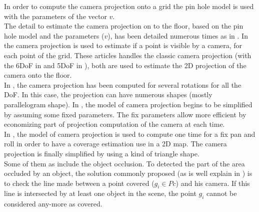  In order to compute the camera projection onto a grid the pin hole model is used with the parameters of the vector $v$.\\
The detail to estimate the camera projection on to the floor, based on the pin hole model and the parameters ($v$), has been detailed numerous times as in \cite{193*fu2014,181*wang2017,165*jiang2010}. In \cite{193*fu2014,181*wang2017,165*jiang2010} the camera projection is used to estimate if a point is visible by a camera, for each point of the grid. These articles handles the classic camera projection (with the 6DoF in \citep{193*fu2014} and 5DoF in \citep{181*wang2017}), both are used to estimate the 2D projection of the camera onto the floor. \\
In  \citep{193*fu2014}, the camera projection has been computed for several rotations for all the DoF. In this case, the projection can have numerous shapes (mostly parallelogram shape).
In \citep{181*wang2017}, the model of camera projection begins to be simplified by assuming some fixed parameters. The fix parameters allow more efficient by economizing part of projection computation of the camera at each time.  \\
In \citep{165*jiang2010}, the model of camera projection is used to compute one time for a fix pan and roll in order to have a coverage estimation use in a 2D map. The camera projection is finally simplified by using a kind of triangle shape.\\
 Some of them as \citep{165*jiang2010,181*wang2017,141*akbarzadeh2013} include the object occlusion. To detected the part of the area occluded by an object, the solution commonly proposed (as is well explain in  \citep{181*wang2017}) is to check the line made between a point covered ($g_i \in Pc$) and his camera. If this line is intersected by at least one object in the scene, the point $g_i$ cannot be considered any-more as covered. 


